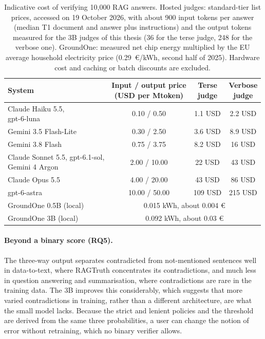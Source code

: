 \begin{table}[htbp]
\centering
\caption{Indicative cost of verifying 10{,}000 RAG answers. Hosted judges: standard-tier list prices, accessed on 19
October 2026, with about 900 input tokens per answer (median T1 document and answer plus instructions) and the output
tokens measured for the 3B judges of this thesis (36 for the terse judge, 248 for the verbose one). GroundOne: measured
net chip energy multiplied by the EU average household electricity price (0.29~€/kWh, second half of 2025). Hardware
cost and caching or batch discounts are excluded.}
\label{tab:disc-cost}
\small
\begin{tabular}{lccc}
\toprule
System & \makecell{Input / output price\\(USD per Mtoken)} & \makecell{Terse\\judge} & \makecell{Verbose\\judge} \\
\midrule
\makecell[l]{Claude Haiku 5.5,\\gpt-6-luna} & 0.10 / 0.50 & 1.1 USD & 2.2 USD \\
Gemini 3.5 Flash-Lite & 0.30 / 2.50 & 3.6 USD & 8.9 USD \\
Gemini 3.8 Flash & 0.75 / 3.75 & 8.2 USD & 16 USD \\
\makecell[l]{Claude Sonnet 5.5, gpt-6.1-sol,\\Gemini 4 Argon} & 2.00 / 10.00 & 22 USD & 43 USD \\
Claude Opus 5.5 & 4.00 / 20.00 & 43 USD & 86 USD \\
gpt-6-astra & 10.00 / 50.00 & 109 USD & 215 USD \\
\midrule
GroundOne 0.5B (local) & \multicolumn{3}{c}{0.015 kWh, about 0.004 €} \\
GroundOne 3B (local) & \multicolumn{3}{c}{0.092 kWh, about 0.03 €} \\
\bottomrule
\end{tabular}
\end{table}

\paragraph{Beyond a binary score (RQ5).} The three-way output separates contradicted from not-mentioned sentences well
in data-to-text, where RAGTruth concentrates its contradictions, and much less in question answering and summarisation,
where contradictions are rare in the training data. The 3B improves this considerably, which suggests that more varied
contradictions in training, rather than a different architecture, are what the small model lacks. Because the strict and
lenient policies and the threshold are derived from the same three probabilities, a user can change the notion of error
without retraining, which no binary verifier allows.

